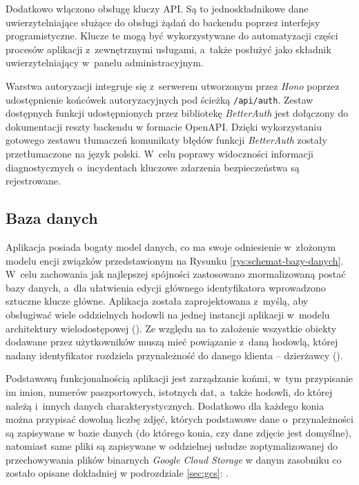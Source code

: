 Dodatkowo włączono obsługę kluczy API. Są to jednoskładnikowe dane uwierzytelniające służące do obsługi żądań do backendu poprzez interfejsy programistyczne. Klucze te mogą być wykorzystywane do automatyzacji części procesów aplikacji z~zewnętrznymi usługami, a~także posłużyć jako składnik uwierzytelniający w~panelu administracyjnym. 

Warstwa autoryzacji integruje się z~serwerem utworzonym przez \textit{Hono} poprzez udostępnienie końcówek autoryzacyjnych pod ścieżką \texttt{/api/auth}. Zestaw dostępnych funkcji udostępnionych przez bibliotekę \textit{BetterAuth} jest dołączony do dokumentacji reszty backendu w formacie OpenAPI. Dzięki wykorzystaniu gotowego zestawu tłumaczeń komunikaty błędów funkcji \textit{BetterAuth} zostały przetłumaczone na język polski. W~celu poprawy widoczności informacji diagnostycznych o~incydentach kluczowe zdarzenia bezpieczeństwa są rejestrowane.

\subsection{Baza danych}

Aplikacja posiada bogaty model danych, co ma swoje odniesienie w~złożonym modelu encji związków przedstawionym na Rysunku \ref{rys:schemat-bazy-danych}. W~celu zachowania jak najlepszej spójności zastosowano znormalizowaną postać bazy danych, a~dla ułatwienia edycji głównego identyfikatora wprowadzono sztuczne klucze główne. Aplikacja została zaprojektowana z~myślą, aby obsługiwać wiele oddzielnych hodowli na jednej instancji aplikacji w~modelu architektury wielodostępowej (). Ze względu na to założenie wszystkie obiekty dodawane przez użytkowników muszą mieć powiązanie z~daną hodowlą, której nadany identyfikator rozdziela przynależność do danego klienta -- dzierżawcy (). 

Podstawową funkcjonalnością aplikacji jest zarządzanie końmi, w~tym przypisanie im imion, numerów paszportowych, istotnych dat, a~także hodowli, do której należą i~innych danych charakterystycznych. Dodatkowo dla każdego konia można przypisać dowolną liczbę zdjęć, których podstawowe dane o~przynależności są zapisywane w bazie danych (do którego konia, czy dane zdjęcie jest domyślne), natomiast same pliki są zapisywane w oddzielnej usłudze zoptymalizowanej do przechowywania plików binarnych \emph{Google Cloud Storage} w danym zasobniku co zostało opisane dokładniej w podrozdziale \ref{sec:gcs}: .

